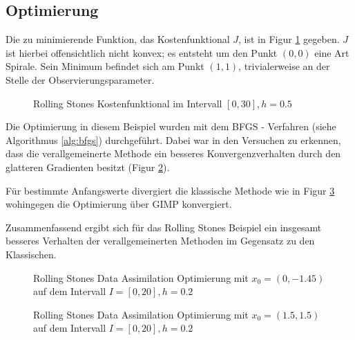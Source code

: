 \subsection{Optimierung}
Die zu minimierende Funktion, das Kostenfunktional $J$, ist in Figur \ref{fig:rolling_costfunctional} gegeben. $J$ ist hierbei offensichtlich nicht konvex; es entsteht um den Punkt $(0,0)$ eine Art Spirale. Sein Minimum befindet sich am Punkt $(1,1)$, trivialerweise an der Stelle der Observierungsparameter. 
\begin{figure}[H]
\centering

\caption{Rolling Stones Kostenfunktional im Intervall $[0,30],h=0.5$}
\label{fig:rolling_costfunctional}
\end{figure}

Die Optimierung in diesem Beispiel wurden mit dem BFGS - Verfahren (siehe Algorithmus \ref{alg:bfgs}) durchgeführt. Dabei war in den Versuchen zu erkennen, dass die verallgemeinerte Methode ein besseres Konvergenzverhalten durch den glatteren Gradienten besitzt (Figur \ref{fig:rollingStonesOpt2}).

Für bestimmte Anfangswerte divergiert die klassische Methode wie in Figur \ref{fig:rollingStonesOpt1} wohingegen die Optimierung über GIMP konvergiert. 

Zusammenfassend ergibt sich für das Rolling Stones Beispiel ein insgesamt besseres Verhalten der verallgemeinerten Methoden im Gegensatz zu den Klassischen.
\begin{figure}[H]
\footnotesize
\centering
\begin{minipage}[b]{0.49\linewidth}

\end{minipage}
\begin{minipage}[b]{0.49\linewidth}

\end{minipage}
\caption{Rolling Stones Data Assimilation Optimierung mit $x_0=(0,-1.45)$ auf dem Intervall $I = [0,20], h=0.2$}
\label{fig:rollingStonesOpt2}
\end{figure}

\begin{figure}[H]
\footnotesize 
\centering
\begin{minipage}[b]{0.49\linewidth}

\end{minipage}
\begin{minipage}[b]{0.49\linewidth}

\end{minipage}
\caption{Rolling Stones Data Assimilation Optimierung mit $x_0=(1.5,1.5)$ auf dem Intervall $I = [0,20], h=0.2$}
\label{fig:rollingStonesOpt1}
\end{figure}


